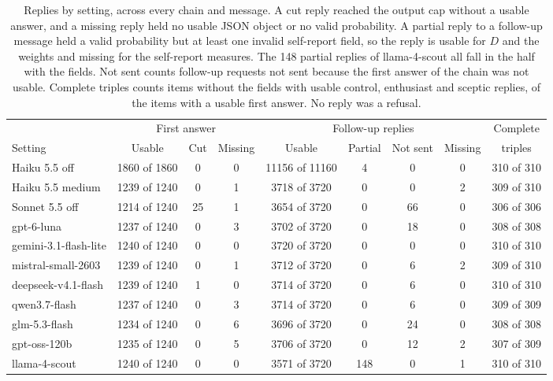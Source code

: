 \begin{table}[t]
\centering
\footnotesize
\setlength{\tabcolsep}{3pt}
\begin{adjustbox}{max width=\linewidth}
\begin{tabular}{lcccccccc}
\toprule
& \multicolumn{3}{c}{First answer} & \multicolumn{4}{c}{Follow-up replies} & Complete \\
Setting & Usable & Cut & Missing & Usable & Partial & Not sent & Missing & triples \\
\midrule
Haiku 5.5 off & 1860 of 1860 & 0 & 0 & 11156 of 11160 & 4 & 0 & 0 & 310 of 310 \\
Haiku 5.5 medium & 1239 of 1240 & 0 & 1 & 3718 of 3720 & 0 & 0 & 2 & 309 of 310 \\
Sonnet 5.5 off & 1214 of 1240 & 25 & 1 & 3654 of 3720 & 0 & 66 & 0 & 306 of 306 \\
gpt-6-luna & 1237 of 1240 & 0 & 3 & 3702 of 3720 & 0 & 18 & 0 & 308 of 308 \\
gemini-3.1-flash-lite & 1240 of 1240 & 0 & 0 & 3720 of 3720 & 0 & 0 & 0 & 310 of 310 \\
mistral-small-2603 & 1239 of 1240 & 0 & 1 & 3712 of 3720 & 0 & 6 & 2 & 309 of 310 \\
deepseek-v4.1-flash & 1239 of 1240 & 1 & 0 & 3714 of 3720 & 0 & 6 & 0 & 310 of 310 \\
qwen3.7-flash & 1237 of 1240 & 0 & 3 & 3714 of 3720 & 0 & 6 & 0 & 309 of 309 \\
glm-5.3-flash & 1234 of 1240 & 0 & 6 & 3696 of 3720 & 0 & 24 & 0 & 308 of 308 \\
gpt-oss-120b & 1235 of 1240 & 0 & 5 & 3706 of 3720 & 0 & 12 & 2 & 307 of 309 \\
llama-4-scout & 1240 of 1240 & 0 & 0 & 3571 of 3720 & 148 & 0 & 1 & 310 of 310 \\
\bottomrule
\end{tabular}
\end{adjustbox}
\caption{Replies by setting, across every chain and message. A cut reply reached the output cap without a usable answer, and a missing reply held no usable JSON object or no valid probability. A partial reply to a follow-up message held a valid probability but at least one invalid self-report field, so the reply is usable for $D$ and the weights and missing for the self-report measures. The 148 partial replies of llama-4-scout all fall in the half with the fields. Not sent counts follow-up requests not sent because the first answer of the chain was not usable. Complete triples counts items without the fields with usable control, enthusiast and sceptic replies, of the items with a usable first answer. No reply was a refusal.}
\label{tab:replies}
\end{table}
